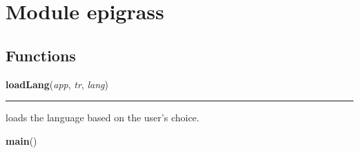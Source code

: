 %
%
%


\section{Module epigrass}

    \label{epigrass}


  \subsection{Functions}

    \label{epigrass:loadLang}

    \vspace{0.5ex}

    \begin{boxedminipage}{\textwidth}

    \raggedright \textbf{loadLang}(\textit{app}, \textit{tr}, \textit{lang})

    \vspace{-1.5ex}

    \rule{\textwidth}{0.5\fboxrule}
    loads the language based on the user's choice.

    \vspace{1ex}

    \end{boxedminipage}

    \label{epigrass:main}

    \vspace{0.5ex}

    \begin{boxedminipage}{\textwidth}

    \raggedright \textbf{main}()

    \end{boxedminipage}


